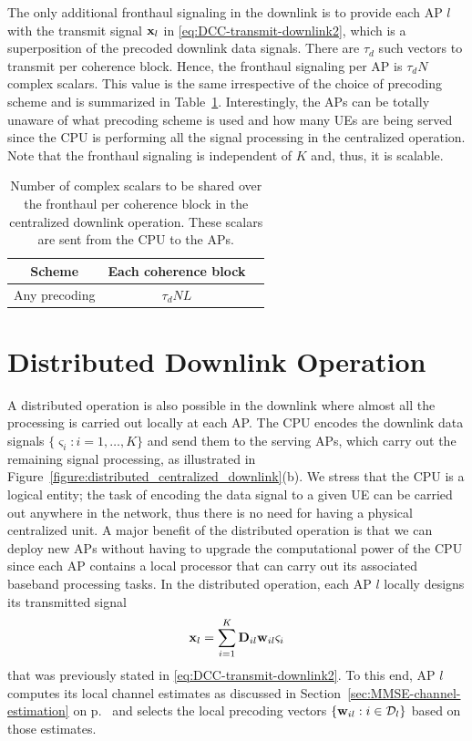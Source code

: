 The only additional fronthaul signaling in the downlink is to provide each AP $l$ with the transmit signal $\mathbf{x}_l$ in \eqref{eq:DCC-transmit-downlink2}, which is a superposition of the precoded downlink data signals. There are $\tau_d$ such vectors to transmit per coherence block. Hence, the fronthaul signaling per AP is $\tau_dN$ complex scalars. This value is the same irrespective of the choice of precoding scheme and is summarized in Table~\ref{tab:signaling-level4-downlink}. Interestingly, the APs can be totally unaware of what precoding scheme is used and how many UEs are being served since the CPU is performing all the signal processing in the centralized operation. Note that the fronthaul signaling is independent of $K$ and, thus, it is scalable.




\begin{table}[t]  
	\caption{Number of complex scalars to be shared over the fronthaul per coherence block in the centralized downlink operation. These scalars are sent from the CPU to the APs.}  \label{tab:signaling-level4-downlink}
	\centering
	\begin{tabular}{|c|c|c|} 
		\hline
		{Scheme} & {Each coherence block}    \\      \hline\hline 
		Any precoding &   $\tau_d NL$         \\ \hline    
	\end{tabular}
\end{table}






\section{Distributed Downlink Operation}
\label{sec:level2-downlink}

A distributed operation is also possible in the downlink where almost all the processing is carried out locally at each AP. The CPU encodes the downlink data signals $\{ \varsigma_i : i =1,\ldots,K\}$ and send them to the serving APs, which carry out the remaining signal processing, as illustrated in Figure~\ref{figure:distributed_centralized_downlink}(b).
We stress that the CPU is a logical entity; the task of encoding the data signal to a given UE can be carried out anywhere in the network, thus there is no need for having a physical centralized unit.
A major benefit of the distributed operation is that we can deploy new APs without having to upgrade the computational power of the CPU since each AP contains a local processor that can carry out its associated baseband processing tasks.
In the distributed operation, each AP $l$ locally designs its transmitted signal
\begin{align} \label{eq:x_l-level2}
\mathbf{x}_l=\sum_{i=1}^K\mathbf{D}_{il}\mathbf{w}_{il}\varsigma_{i}
\end{align}
that was previously stated in \eqref{eq:DCC-transmit-downlink2}. To this end, AP $l$ computes its local channel estimates as discussed in Section~\ref{sec:MMSE-channel-estimation} on p.~\pageref{sec:MMSE-channel-estimation} and selects the local precoding vectors $\{\mathbf{w}_{il} : i\in \mathcal{D}_l \}$ based on those estimates.

